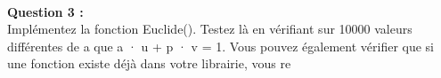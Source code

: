 \documentclass[a4paper,11pt]{article}
\begin{document}
        \textbf{\\Question 3 : \\}Implémentez la fonction Euclide(). Testez là en vérifiant sur 10000 valeurs différentes de a que a · u + p · v = 1. Vous pouvez également vérifier que si une fonction existe déjà dans votre librairie, vous re
\end{document}
